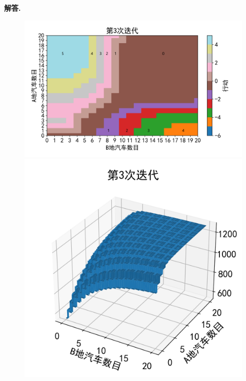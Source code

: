 \documentclass[12pt, a4paper, oneside]{ctexart}
\newenvironment{solution}[1][]{\par\noindent\textbf{#1解答. }}{\smallskip\par}  %
\begin{document}
\begin{solution}
\begin{figure}[htbp]
{\begin{minipage}[b]{.2\linewidth}
            \end{minipage}
        }
    \end{figure}
    \begin{figure}[htbp]
        \hspace{-0.5cm}
        \subfigure  %
        {
            \begin{minipage}[b]{.62\linewidth}
                \centering
                \includegraphics[scale=0.22]{078/078页例题4.2policy3.png}
            \end{minipage}
        }
        \subfigure
        {
            \begin{minipage}[b]{.2\linewidth}
                \centering
                \includegraphics[scale=0.52]{078/078页例题4.2value3.png}
            \end{minipage}
        }
    \end{figure}
\end{solution}
\end{document}
